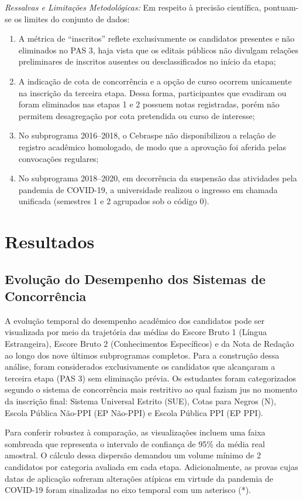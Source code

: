 \documentclass[12pt]{article}
\begin{document}
\textit{Ressalvas e Limitações Metodológicas:} Em respeito à precisão científica, pontuam-se os limites do conjunto de dados:
\begin{enumerate}
    \item A métrica de ``inscritos'' reflete exclusivamente os candidatos presentes e não eliminados no PAS 3, haja vista que os editais públicos não divulgam relações preliminares de inscritos ausentes ou desclassificados no início da etapa;
    \item A indicação de cota de concorrência e a opção de curso ocorrem unicamente na inscrição da terceira etapa. Dessa forma, participantes que evadiram ou foram eliminados nas etapas 1 e 2 possuem notas registradas, porém não permitem desagregação por cota pretendida ou curso de interesse;
    \item No subprograma 2016--2018, o Cebraspe não disponibilizou a relação de registro acadêmico homologado, de modo que a aprovação foi aferida pelas convocações regulares;
    \item No subprograma 2018--2020, em decorrência da suspensão das atividades pela pandemia de COVID-19, a universidade realizou o ingresso em chamada unificada (semestres 1 e 2 agrupados sob o código 0).
\end{enumerate}

\section{Resultados}

\subsection{Evolução do Desempenho dos Sistemas de Concorrência}

A evolução temporal do desempenho acadêmico dos candidatos pode ser visualizada por meio da trajetória das médias do Escore Bruto 1 (Língua Estrangeira), Escore Bruto 2 (Conhecimentos Específicos) e da Nota de Redação ao longo dos nove últimos subprogramas completos. Para a construção dessa análise, foram considerados exclusivamente os candidatos que alcançaram a terceira etapa (PAS 3) sem eliminação prévia. Os estudantes foram categorizados segundo o sistema de concorrência mais restritivo ao qual faziam jus no momento da inscrição final: Sistema Universal Estrito (SUE), Cotas para Negros (N), Escola Pública Não-PPI (EP Não-PPI) e Escola Pública PPI (EP PPI). 

Para conferir robustez à comparação, as visualizações incluem uma faixa sombreada que representa o intervalo de confiança de 95\% da média real amostral. O cálculo dessa dispersão demandou um volume mínimo de 2 candidatos por categoria avaliada em cada etapa. Adicionalmente, as provas cujas datas de aplicação sofreram alterações atípicas em virtude da pandemia de COVID-19 foram sinalizadas no eixo temporal com um asterisco (*).
\end{document}
